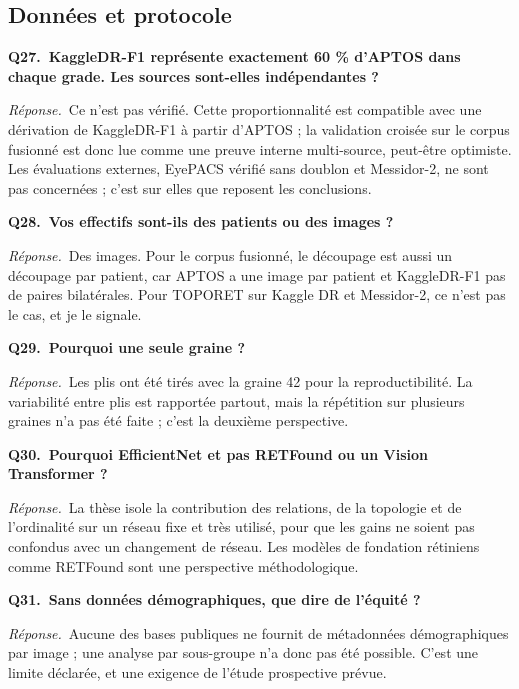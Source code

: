 \documentclass[11pt,a4paper]{article}
\begin{document}
\subsection*{Données et protocole}
\textbf{Q27.~KaggleDR-F1 représente exactement 60 \% d'APTOS dans chaque grade. Les sources sont-elles indépendantes ?}\par\nopagebreak
\textit{Réponse.}~Ce n'est pas vérifié. Cette proportionnalité est compatible avec une dérivation de KaggleDR-F1 à partir d'APTOS ; la validation croisée sur le corpus fusionné est donc lue comme une preuve interne multi-source, peut-être optimiste. Les évaluations externes, EyePACS vérifié sans doublon et Messidor-2, ne sont pas concernées ; c'est sur elles que reposent les conclusions.\par\medskip
\textbf{Q28.~Vos effectifs sont-ils des patients ou des images ?}\par\nopagebreak
\textit{Réponse.}~Des images. Pour le corpus fusionné, le découpage est aussi un découpage par patient, car APTOS a une image par patient et KaggleDR-F1 pas de paires bilatérales. Pour TOPORET sur Kaggle DR et Messidor-2, ce n'est pas le cas, et je le signale.\par\medskip
\textbf{Q29.~Pourquoi une seule graine ?}\par\nopagebreak
\textit{Réponse.}~Les plis ont été tirés avec la graine 42 pour la reproductibilité. La variabilité entre plis est rapportée partout, mais la répétition sur plusieurs graines n'a pas été faite ; c'est la deuxième perspective.\par\medskip
\textbf{Q30.~Pourquoi EfficientNet et pas RETFound ou un Vision Transformer ?}\par\nopagebreak
\textit{Réponse.}~La thèse isole la contribution des relations, de la topologie et de l'ordinalité sur un réseau fixe et très utilisé, pour que les gains ne soient pas confondus avec un changement de réseau. Les modèles de fondation rétiniens comme RETFound sont une perspective méthodologique.\par\medskip
\textbf{Q31.~Sans données démographiques, que dire de l'équité ?}\par\nopagebreak
\textit{Réponse.}~Aucune des bases publiques ne fournit de métadonnées démographiques par image ; une analyse par sous-groupe n'a donc pas été possible. C'est une limite déclarée, et une exigence de l'étude prospective prévue.\par\medskip
\end{document}
